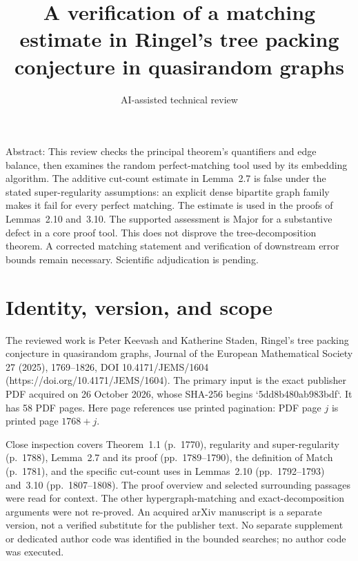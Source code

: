 \documentclass[10pt]{article}
\title{A verification of a matching estimate in
Ringel’s tree packing conjecture in quasirandom graphs}
\author{AI-assisted technical review}
\date{}
\begin{document}
\maketitle
Abstract: This review checks the principal theorem’s quantifiers and edge balance, then examines the random perfect-matching tool used by its embedding algorithm. The additive cut-count estimate in Lemma 2.7 is false under the stated super-regularity assumptions: an explicit dense bipartite graph family makes it fail for every perfect matching. The estimate is used in the proofs of Lemmas 2.10 and 3.10. The supported assessment is Major for a substantive defect in a core proof tool. This does not disprove the tree-decomposition theorem. A corrected matching statement and verification of downstream error bounds remain necessary. Scientific adjudication is pending.\par
\section*{Identity, version, and scope}
The reviewed work is Peter Keevash and Katherine Staden, Ringel’s tree packing conjecture in quasirandom graphs, Journal of the European Mathematical Society 27 (2025), 1769–1826, DOI 10.4171/JEMS/1604 (https://doi.org/10.4171/JEMS/1604). The primary input is the exact publisher PDF acquired on 26 October 2026, whose SHA-256 begins `5dd8b480ab983bdf`. It has 58 PDF pages. Here page references use printed pagination: PDF page \(j\) is printed page \(1768+j\).\par
Close inspection covers Theorem 1.1 (p. 1770), regularity and super-regularity (p. 1788), Lemma 2.7 and its proof (pp. 1789–1790), the definition of Match (p. 1781), and the specific cut-count uses in Lemmas 2.10 (pp. 1792–1793) and 3.10 (pp. 1807–1808). The proof overview and selected surrounding passages were read for context. The other hypergraph-matching and exact-decomposition arguments were not re-proved. An acquired arXiv manuscript is a separate version, not a verified substitute for the publisher text. No separate supplement or dedicated author code was identified in the bounded searches; no author code was executed.\par
\end{document}
